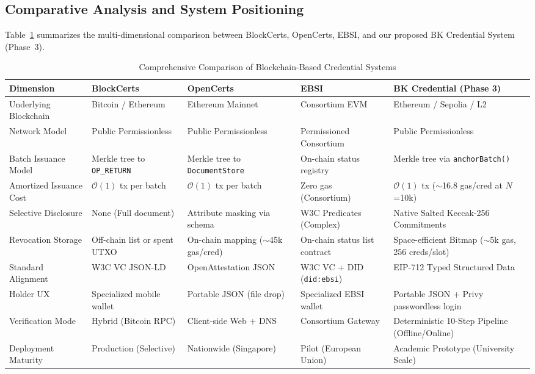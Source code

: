 \subsection{Comparative Analysis and System Positioning}

Table~\ref{tab:related-work-comparison} summarizes the multi-dimensional comparison between BlockCerts, OpenCerts, EBSI, and our proposed BK Credential System (Phase~3).

\begin{table}[H]
\centering
\renewcommand{\arraystretch}{1.25}
\begin{tabular}{|p{3.2cm}|p{2.8cm}|p{2.8cm}|p{2.8cm}|p{3.2cm}|}
\hline
\textbf{Dimension} & \textbf{BlockCerts} & \textbf{OpenCerts} & \textbf{EBSI} & \textbf{BK Credential (Phase 3)} \\
\hline
Underlying Blockchain & Bitcoin / Ethereum & Ethereum Mainnet & Consortium EVM & Ethereum / Sepolia / L2 \\
\hline
Network Model & Public Permissionless & Public Permissionless & Permissioned Consortium & Public Permissionless \\
\hline
Batch Issuance Model & Merkle tree to \texttt{OP\_RETURN} & Merkle tree to \texttt{DocumentStore} & On-chain status registry & Merkle tree via \texttt{anchorBatch()} \\
\hline
Amortized Issuance Cost & $\mathcal{O}(1)$ tx per batch & $\mathcal{O}(1)$ tx per batch & Zero gas (Consortium) & $\mathcal{O}(1)$ tx ($\sim$16.8 gas/cred at $N$=10k) \\
\hline
Selective Disclosure & None (Full document) & Attribute masking via schema & W3C Predicates (Complex) & Native Salted Keccak-256 Commitments \\
\hline
Revocation Storage & Off-chain list or spent UTXO & On-chain mapping ($\sim$45k gas/cred) & On-chain status list contract & Space-efficient Bitmap ($\sim$5k gas, 256 creds/slot) \\
\hline
Standard Alignment & W3C VC JSON-LD & OpenAttestation JSON & W3C VC + DID (\texttt{did:ebsi}) & EIP-712 Typed Structured Data \\
\hline
Holder UX & Specialized mobile wallet & Portable JSON (file drop) & Specialized EBSI wallet & Portable JSON + Privy passwordless login \\
\hline
Verification Mode & Hybrid (Bitcoin RPC) & Client-side Web + DNS & Consortium Gateway & Deterministic 10-Step Pipeline (Offline/Online) \\
\hline
Deployment Maturity & Production (Selective) & Nationwide (Singapore) & Pilot (European Union) & Academic Prototype (University Scale) \\
\hline
\end{tabular}
\caption{Comprehensive Comparison of Blockchain-Based Credential Systems}
\label{tab:related-work-comparison}
\end{table}

